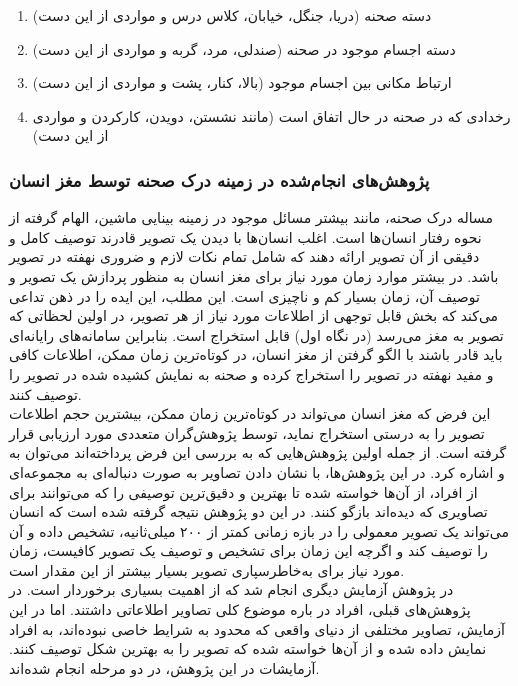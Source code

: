 \begin{enumerate}
\item دسته‌ صحنه (دریا، جنگل، خیابان، کلاس درس و مواردی از این دست)
\item دسته‌ اجسام موجود در صحنه (صندلی، مرد، گربه و مواردی از این دست)
\item ارتباط مکانی بین اجسام موجود (بالا، کنار، پشت و مواردی از این دست)
\item رخدادی که در صحنه در حال اتفاق است (مانند نشستن، دویدن، کارکردن و مواردی از این دست)
\end{enumerate}

\subsubsection{پژوهش‌های انجام‌شده در زمینه درک صحنه توسط مغز انسان}
مساله درک صحنه، مانند بیشتر مسائل موجود در زمینه بینایی ماشین، الهام گرفته از نحوه رفتار انسان‌ها است. اغلب انسان‌ها با دیدن یک تصویر قادرند توصیف کامل و دقیقی از آن تصویر ارائه دهند که شامل تمام نکات لازم و ضروری نهفته در تصویر باشد. در بیشتر موارد زمان مورد نیاز برای مغز انسان به منظور پردازش یک تصویر و توصیف آن، زمان بسیار کم و ناچیزی است. این مطلب، این ایده را در ذهن تداعی می‌کند که بخش قابل توجهی از اطلاعات مورد نیاز از هر تصویر، در اولین لحظاتی که تصویر به مغز می‌رسد (در نگاه اول) قابل استخراج است. بنابراین سامانه‌های رایانه‌ای باید قادر باشند با الگو گرفتن از مغز انسان، در کوتاه‌ترین زمان ممکن، اطلاعات کافی و مفید نهفته در تصویر را استخراج کرده و صحنه به نمایش کشیده شده در تصویر را توصیف کنند.
\\
این فرض که مغز انسان می‌تواند در کوتاه‌ترین زمان ممکن، بیشترین حجم اطلاعات تصویر را به درستی استخراج نماید، توسط پژوهش‌گران متعددی مورد ارزیابی قرار گرفته است. از جمله اولین پژوهش‌هایی که به بررسی این فرض پرداخته‌اند می‌توان به 
\cite{potter1976short}
و
\cite{potter2002recognition}
اشاره کرد. در این‌ پژوهش‌ها، با نشان دادن تصاویر به صورت دنباله‌ای به مجموعه‌ای از افراد، از آن‌ها خواسته شده تا بهترین و دقیق‌ترین توصیفی را که می‌توانند برای تصاویری که دیده‌اند بازگو کنند. در این دو پژوهش نتیجه گرفته شده است که انسان می‌تواند یک تصویر معمولی را در بازه زمانی کمتر از ۲۰۰ میلی‌ثانیه، تشخیص داده و آن را توصیف کند و اگرچه این زمان برای تشخیص و توصیف یک تصویر کافیست، زمان مورد نیاز برای به‌خاطرسپاری تصویر بسیار بیشتر از این مقدار است.
\\
در پژوهش\cite{fei2007we}
آزمایش دیگری انجام شد که از اهمیت بسیاری برخوردار است. در پژوهش‌های قبلی، افراد در باره موضوع کلی تصاویر اطلاعاتی داشتند. اما در این آزمایش، تصاویر مختلفی از دنیای واقعی که محدود به شرایط خاصی نبوده‌اند، به افراد نمایش داده شده و از آن‌ها خواسته شده که تصویر را به بهترین شکل توصیف کنند. آزمایشات در این پژوهش، در دو مرحله انجام شده‌اند.

